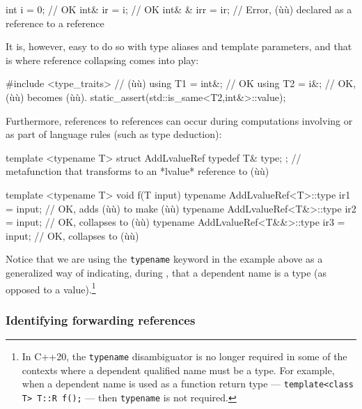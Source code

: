 \begin{emcppslisting}
int    i   = 0;   // OK
int&   ir  = i;   // OK
int& & irr = ir;  // Error, (ù{}ù) declared as a reference to a reference
\end{emcppslisting}

\noindent It is, however, easy to do so with type aliases and template parameters,
and that is where reference collapsing comes into play:

\begin{emcppslisting}[emcppsbatch=e4]
#include <type_traits>  // (ù{}ù)
using T1 = int&;  // OK
using T2 = i&;    // OK, (ù{}ù) becomes (ù{}ù).
static_assert(std::is_same<T2,int&>::value);
\end{emcppslisting}

\noindent Furthermore, references to references can occur during computations involving  or as part of
language rules (such as type deduction):

\begin{emcppslisting}
template <typename T>
struct AddLvalueRef { typedef T& type; };
    // metafunction that transforms to an *lvalue* reference to (ù{}ù)

template <typename T>
void f(T input)
{
    typename AddLvalueRef<T>::type ir1 = input;    // OK, adds (ù{\codeincomments{\&}}ù) to make (ù{}ù)
    typename AddLvalueRef<T&>::type ir2 = input;   // OK, collapses to (ù{}ù)
    typename AddLvalueRef<T&&>::type ir3 = input;  // OK, collapses to (ù{}ù)
}
\end{emcppslisting}

\noindent Notice that we are using the \lstinline!typename! keyword in the example above as a
generalized way of indicating, during ,
that a dependent name is a type (as opposed to a value).\footnote{In C++20, the \lstinline!typename! disambiguator is no longer required in some of the contexts where a dependent qualified name must be a type. For example, when a dependent name is used as a function return type --- \lstinline!template<class T> T::R f();! --- then \lstinline!typename! is not required.}

\subsubsection[Identifying forwarding references]{Identifying forwarding references}\label{identifying-forwarding-references}


